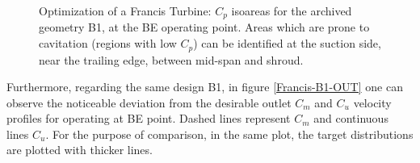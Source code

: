 \begin{figure}[h!]
\begin{minipage}[b]{1\linewidth}
 \centering
\end{minipage}
\caption{Optimization of a Francis Turbine: $C_p$ isoareas for the archived geometry B1, at the BE operating point. Areas which are prone to cavitation (regions with low $C_p$) can be identified at the suction side, near the trailing edge, between mid-span and shroud.}
\label{Francis-B1-BE}
\end{figure}

Furthermore, regarding the same design  B1, in figure \ref{Francis-B1-OUT} one can observe the noticeable deviation from the desirable outlet $C_m$ and $C_u$ velocity profiles for operating at BE point.  Dashed lines represent $C_m$ and continuous lines $C_u$. For the purpose of comparison, in the same plot, the target distributions are plotted with thicker lines.   

